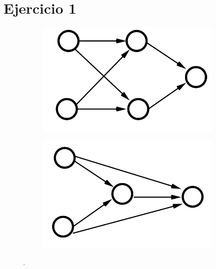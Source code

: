 \section*{Ejercicio 1}
\graphicspath{{Figuras/}}

\begin{figure}[h!]
    \centering
    \begin{subfigure}[h]{0.3\textwidth} 
        \includegraphics[width=\textwidth]{Figuras/ejer_1_221.png}
    \end{subfigure}       
    \begin{subfigure}[h]{0.3\textwidth} 
        \includegraphics[width=\textwidth]{Figuras/ejer_1_211.png}
    \end{subfigure}
    \caption{.} \label{fig:1_Arquitecturas}
\end{figure}

